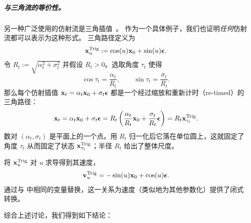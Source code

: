 \subparagraph{与三角流的等价性。}
另一种广泛使用的仿射流是三角插值~\citep{salimans2021progressive,albergo2023stochastic,lu2024simplifying}。
作为一个具体例子，我们也证明\emph{任何}仿射流都可以表示为这种形式。
三角路径定义为
\begin{align}\label{eq:trig-para}
{\mathbf{x}}^{\mathrm{Trig}}_u := \cos(u) {\mathbf{x}}_0 + \sin(u){\bm{\epsilon}} .
\end{align}
令 $R_t := \sqrt{\alpha_t^2 + \sigma_t^2}$ 并假设 $R_t>0$。选取角度 $\tau_t$ 使得
\[
\cos \tau_t = \frac{\alpha_t}{R_t},
\qquad
\sin \tau_t = \frac{\sigma_t}{R_t}.
\]
那么每个仿射插值 ${\mathbf{x}}_t=\alpha_t{\mathbf{x}}_0+\sigma_t{\bm{\epsilon}}$ 都是一个经过缩放和重新计时（re-timed）的三角路径：
\begin{align}\label{eq:any-to-trig}
{\mathbf{x}}_t
= \alpha_t{\mathbf{x}}_0+\sigma_t{\bm{\epsilon}}
= R_t \left(\frac{\alpha_t}{R_t}{\mathbf{x}}_0+\frac{\sigma_t}{R_t}{\bm{\epsilon}}\right)
= R_t {\mathbf{x}}^{\mathrm{Trig}}_{\tau_t}.
\end{align}
数对 $(\alpha_t,\sigma_t)$ 是平面上的一个点。用 $R_t$ 归一化后它落在单位圆上，这就固定了角度 $\tau_t$ 从而固定了状态 ${\mathbf{x}}^{\mathrm{Trig}}_{\tau_t}$；半径 $R_t$ 给出了整体尺度。

将 ${\mathbf{x}}^{\mathrm{Trig}}_u$ 对 $u$ 求导得到其速度，
\[
{\mathbf{v}}^{\mathrm{Trig}}_u = -\sin(u) {\mathbf{x}}_0 + \cos(u) {\bm{\epsilon}}.
\]
通过与  中相同的变量替换，这一关系为速度（类似地为其他参数化）提供了闭式转换。


综合上述讨论，我们得到如下结论：



